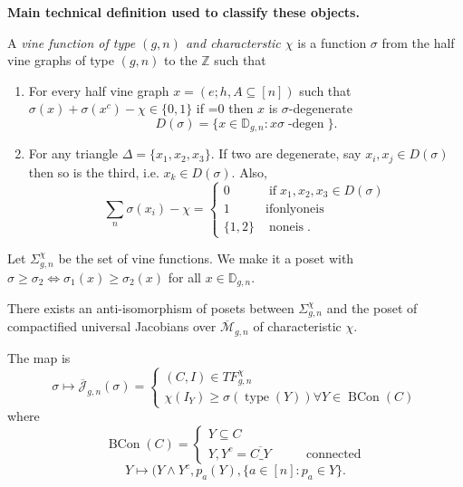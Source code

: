\medskip\noindent
{\bf Main technical definition
used to classify these objects.}

\begin{definition}
\label{definition-vine}
A {\it vine function of type $(g,n)$
and characterstic $\chi$} is
a function $\sigma$ from the half vine graphs of
type $(g,n)$ to the $\mathbb{Z}$ such that
\begin{enumerate}
\item For every half vine graph
$x=(e;h,A \subseteq [n])$
such that $\sigma(x)+\sigma(x^c)-\chi
\in \{0,1\}$ if =0 then
$x$ is $\sigma$-degenerate
$$
D(\sigma)=\{x \in \mathbb{D}_{g,n}:
x \sigma\operatorname{-degen}\}.
$$
\item For any triangle
$\Delta=\{x_1,x_2,x_3\}$.
If two are degenerate, say $x_i,x_j \in
D(\sigma)$ then so is the third, i.e. $x_k
\in D(\sigma)$. Also, 
$$
\sum_n
\sigma(x_i)-\chi = 
\begin{cases}
0\qquad &\operatorname{if} x_1,x_2,x_3
\in D(\sigma) \\
1\qquad &\operatorname{if only one is}\\
\{1,2\}&\operatorname{none is}.
\end{cases}
$$
\end{enumerate}
\end{definition}

Let $\Sigma_{g,n}^{\chi}$ be the set
of vine functions. We make it a poset with
$\sigma \geq \sigma_2 \iff
\sigma_1(x) \geq \sigma_2(x)$ for all
$x \in \mathbb{D}_{g,n}$.

\begin{theorem}
\label{theorem-main-a}
There exists an anti-isomorphism of posets
between $\Sigma_{g,n}^{\chi}$ and the
poset of compactified universal Jacobians
over $\overline{\mathcal{M}}_{g,n}$ of
characteristic $\chi$.
\end{theorem}

\noindent
The map is
$$
\sigma \mapsto 
\overline{\mathcal{J}}_{g,n}(\sigma)
=
\begin{cases}
(C,I)\in TF_{g,n}^{\chi}\\
\chi(I_Y) \geq
\sigma(\operatorname{type}(Y))\forall Y
\in \operatorname{BCon}(C)
\end{cases}
$$
\noindent
where
$$
\operatorname{BCon}(C)
=
\begin{cases}
Y \subseteq C \\
Y,Y^c=\overline{C\_Y}\qquad
&\operatorname{connected}
\end{cases}
$$
$$
Y \mapsto (Y \wedge Y^c,
p_a(Y),
\{a \in [n]:p_a \in Y\}.
$$

